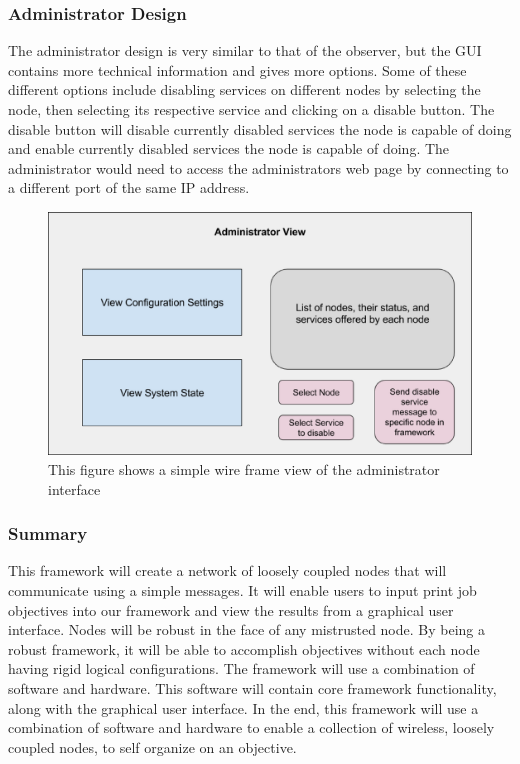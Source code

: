 \documentclass[draftclsnofoot, onecolumn, compsoc, 10pt]{IEEEtran}
\begin{document}
\subsubsection{Administrator Design}
The administrator design is very similar to that of the observer, but the GUI contains more technical information and gives more options. Some of these different options include disabling services on different nodes by selecting the node, then selecting its respective service and clicking on a disable button. The disable button will disable currently disabled services the node is capable of doing and enable currently disabled services the node is capable of doing. 
The administrator would need to access the administrators web page by connecting to a different port of the same IP address.  
\begin{figure}[H]
\centering
\includegraphics[scale=0.4]{admin}
\captionsetup{justification=centering}
\caption{This figure shows a simple wire frame view of the administrator interface}
\end{figure}




\subsubsection{Summary}
This framework will create a network of loosely coupled nodes that will communicate using a simple messages. It will enable users to input print job objectives into our framework and view the results from a graphical user interface. Nodes will be robust in the face of any mistrusted node. By being a robust framework, it will be able to accomplish objectives without each node having rigid logical configurations. The framework will use a combination of software and hardware. This software will contain core framework functionality, along with the graphical user interface. In the end, this framework will use a combination of software and hardware to enable a collection of wireless, loosely coupled nodes, to self organize on an objective.
\end{document}
